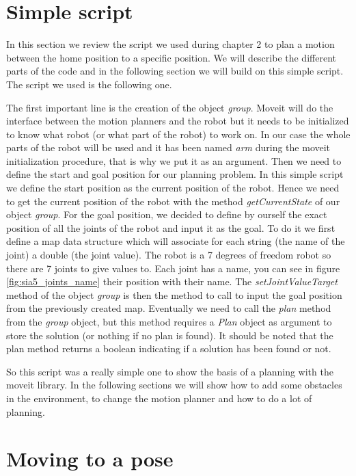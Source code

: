 \section{Simple script}

In this section we review the script we used during chapter 2 to plan a motion between the home position to a specific position. We will describe the different parts of the code and in the following section we will build on this simple script. The script we used is the following one.



The first important line is the creation of the object \emph{group}. Moveit will do the interface between the motion planners and the robot but it needs to be initialized to know what robot (or what part of the robot) to work on. In our case the whole parts of the robot will be used and it has been named \emph{arm} during the moveit initialization procedure, that is why we put it as an argument. Then we need to define the start and goal position for our planning problem. In this simple script we define the start position as the current position of the robot. Hence we need to get the current position of the robot with the method \emph{getCurrentState} of our object \emph{group}. For the goal position, we decided to define by ourself the exact position of all the joints of the robot and input it as the goal. To do it we first define a map data structure which will associate for each string (the name of the joint) a double (the joint value). The robot is a 7 degrees of freedom robot so there are 7 joints to give values to. Each joint has a name, you can see in figure \ref{fig:sia5_joints_name} their position with their name. The \emph{setJointValueTarget} method of the object \emph{group} is then the method to call to input the goal position from the previously created map. Eventually we need to call the \emph{plan} method from the \emph{group} object, but this method requires a \emph{Plan} object as argument to store the solution (or nothing if no plan is found). It should be noted that the plan method returns a boolean indicating if a solution has been found or not.

So this script was a really simple one to show the basis of a planning with the moveit library. In the following sections we will show how to add some obstacles in the environment, to change the motion planner and how to do a lot of planning.


\section{Moving to a pose}

